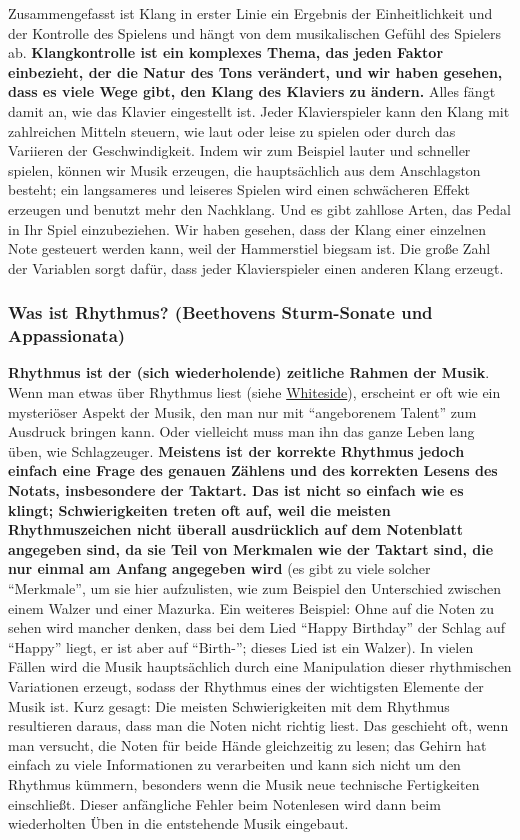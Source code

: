 Zusammengefasst ist Klang in erster Linie ein Ergebnis der Einheitlichkeit und der Kontrolle des Spielens und hängt von dem musikalischen Gefühl des Spielers ab.
\textbf{Klangkontrolle ist ein komplexes Thema, das jeden Faktor einbezieht, der die Natur des Tons verändert, und wir haben gesehen, dass es viele Wege gibt, den Klang des Klaviers zu ändern.}
Alles fängt damit an, wie das Klavier eingestellt ist.
Jeder Klavierspieler kann den Klang mit zahlreichen Mitteln steuern, wie laut oder leise zu spielen oder durch das Variieren der Geschwindigkeit.
Indem wir zum Beispiel lauter und schneller spielen, können wir Musik erzeugen, die hauptsächlich aus dem Anschlagston besteht;
ein langsameres und leiseres Spielen wird einen schwächeren Effekt erzeugen und benutzt mehr den Nachklang.
Und es gibt zahllose Arten, das Pedal in Ihr Spiel einzubeziehen.
Wir haben gesehen, dass der Klang einer einzelnen Note gesteuert werden kann, weil der Hammerstiel biegsam ist.
Die große Zahl der Variablen sorgt dafür, dass jeder Klavierspieler einen anderen Klang erzeugt.
 

\subsubsection{Was ist Rhythmus? (Beethovens Sturm-Sonate und Appassionata)}
\label{c1iii1b}

\textbf{Rhythmus ist der (sich wiederholende) zeitliche Rahmen der Musik}.
Wenn man etwas über Rhythmus liest (siehe \hyperref[Whiteside]{Whiteside}), erscheint er oft wie ein mysteriöser Aspekt der Musik, den man nur mit \enquote{angeborenem Talent} zum Ausdruck bringen kann.
Oder vielleicht muss man ihn das ganze Leben lang üben, wie Schlagzeuger.
\textbf{Meistens ist der korrekte Rhythmus jedoch einfach eine Frage des genauen Zählens und des korrekten Lesens des Notats, insbesondere der Taktart.
Das ist nicht so einfach wie es klingt; Schwierigkeiten treten oft auf, weil die meisten Rhythmuszeichen nicht überall ausdrücklich auf dem Notenblatt angegeben sind, da sie Teil von Merkmalen wie der Taktart sind, die nur einmal am Anfang angegeben wird} (es gibt zu viele solcher \enquote{Merkmale}, um sie hier aufzulisten, wie zum Beispiel den Unterschied zwischen einem Walzer und einer Mazurka.
Ein weiteres Beispiel: Ohne auf die Noten zu sehen wird mancher denken, dass bei dem Lied \enquote{Happy Birthday} der Schlag auf \enquote{Happy} liegt, er ist aber auf \enquote{Birth-}; dieses Lied ist ein Walzer).
In vielen Fällen wird die Musik hauptsächlich durch eine Manipulation dieser rhythmischen Variationen erzeugt, sodass der Rhythmus eines der wichtigsten Elemente der Musik ist.
Kurz gesagt: Die meisten Schwierigkeiten mit dem Rhythmus resultieren daraus, dass man die Noten nicht richtig liest.
Das geschieht oft, wenn man versucht, die Noten für beide Hände gleichzeitig zu lesen; das Gehirn hat einfach zu viele Informationen zu verarbeiten und kann sich nicht um den Rhythmus kümmern, besonders wenn die Musik neue technische Fertigkeiten einschließt.
Dieser anfängliche Fehler beim Notenlesen wird dann beim wiederholten Üben in die entstehende Musik eingebaut.

